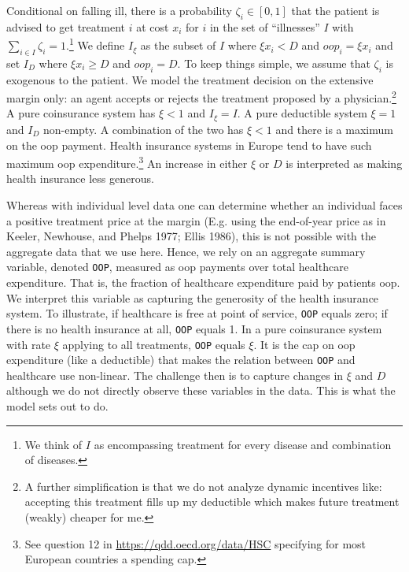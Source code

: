 \documentclass[a4paper,12pt]{article}
\makeatletter
\newcommand{\citeprocitem}[2]{\hyper@linkstart{cite}{citeproc_bib_item_#1}#2\hyper@linkend}
\makeatother
\begin{document}
Conditional on falling ill, there is a probability \(\zeta_i \in [0,1]\) that the patient is advised to get treatment \(i\) at cost \(x_i\) for \(i\) in the set of ``illnesses'' \(I\) with \(\sum_{i \in I} \zeta_i =1\).\footnote{We think of \(I\) as encompassing treatment for every disease and combination of diseases.} We define \(I_{\xi}\) as the subset of \(I\) where \(\xi x_i < D\) and \(oop_i = \xi x_i\) and set \(I_D\) where \(\xi x_i \geq D\) and \(oop_i = D\). To keep things simple, we assume that \(\zeta_i\) is exogenous to the patient. We model the treatment decision on the extensive margin only: an agent accepts or rejects the treatment proposed by a physician.\footnote{A further simplification is that we do not analyze dynamic incentives like: accepting this treatment fills up my deductible which makes future treatment (weakly) cheaper for me.} A pure coinsurance system has \(\xi < 1\) and \(I_{\xi}=I\). A pure deductible system \(\xi=1\) and \(I_D\) non-empty. A combination of the two has \(\xi<1\) and there is a maximum on the oop payment. Health insurance systems in Europe tend to have such maximum oop expenditure.\footnote{See question 12 in \url{https://qdd.oecd.org/data/HSC} specifying for most European countries a spending cap.} An increase in either \(\xi\) or \(D\) is interpreted as making health insurance less generous.

Whereas with individual level data one can determine whether an individual faces a positive treatment price at the margin (E.g. using the end-of-year price as in \citeprocitem{15}{Keeler, Newhouse, and Phelps 1977}; \citeprocitem{10}{Ellis 1986}), this is not possible with the aggregate data that we use here. Hence, we rely on an aggregate summary variable, denoted \texttt{OOP}, measured as oop payments over total healthcare expenditure. That is, the fraction of healthcare expenditure paid by patients oop. We interpret this variable as capturing the generosity of the health insurance system. To illustrate, if healthcare is free at point of service, \texttt{OOP} equals zero; if there is no health insurance at all, \texttt{OOP} equals 1. In a pure coinsurance system with rate \(\xi\) applying to all treatments, \texttt{OOP} equals \(\xi\). It is the cap on oop expenditure (like a deductible) that makes the relation between \texttt{OOP} and healthcare use non-linear. The challenge then is to capture changes in \(\xi\) and \(D\) although we do not directly observe these variables in the data. This is what the model sets out to do.
\end{document}
